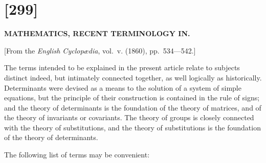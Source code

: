 \documentclass[11pt,a4paper]{book}
\begin{document}
\newpage


\section*{[299]}

\begin{center}
\Large\bfseries MATHEMATICS, RECENT TERMINOLOGY IN.
\end{center}

\begin{center}
[From the \textit{English Cyclop\ae dia}, vol.~v. (1860), pp.~534---542.]
\end{center}

\vspace{1em}

The terms intended to be explained in the present article relate to subjects distinct indeed, but intimately connected together, as well logically as historically. Determinants were devised as a means to the solution of a system of simple equations, but the principle of their construction is contained in the rule of signs; and the theory of determinants is the foundation of the theory of matrices, and of the theory of invariants or covariants. The theory of groups is closely connected with the theory of substitutions, and the theory of substitutions is the foundation of the theory of determinants.

\vspace{1em}

The following list of terms may be convenient:
\end{document}
